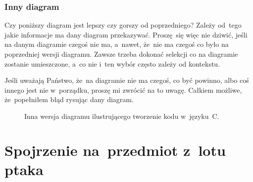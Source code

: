\documentclass[10pt,t]{beamer}
\begin{document}
\begin{frame}
  \frametitle{Inny diagram}


  Czy poniższy diagram jest lepszy czy gorszy od poprzedniego? Zależy
  od~tego jakie informacje ma dany diagram przekazywać. Proszę~się więc nie
  dziwić, jeśli na danym diagramie czegoś nie ma, a~nawet, że~nie ma czegoś
  co było na poprzedniej wersji diagramu. Zawsze trzeba dokonać selekcji co
  na diagramie zostanie umieszczone, a~co nie i~ten wybór często zależy
  od kontekstu.

  Jeśli uważają Państwo, że~na diagramie nie ma czegoś, co być powinno,
  albo coś innego jest nie w~porządku, \alert{proszę} mi zwrócić na to
  uwagę. Całkiem możliwe, że~popełniłem błąd rysując dany diagram.






  \begin{figure}

    \label{fig:Also-creating-code-in-C}


    \caption{Inna wersja diagramu ilustrującego tworzenie kodu w~języku~C.}


  \end{figure}

\end{frame}










\section{Spojrzenie na~przedmiot z~lotu ptaka}
\end{document}
